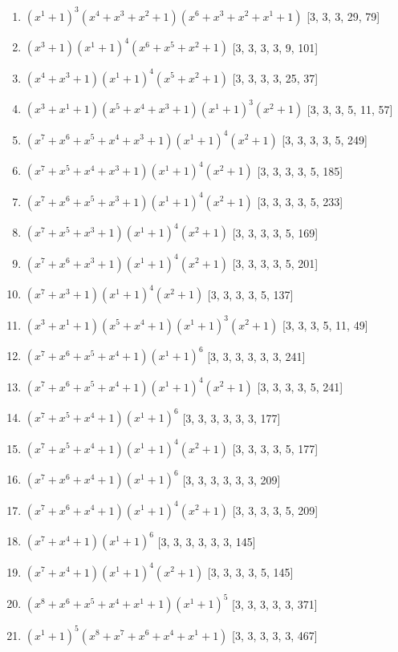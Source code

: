 \documentclass[10pt,twocolumn]{article}
\begin{document}
\begin{enumerate}
\item $(x^{1} + 1)^{3}(x^{4} + x^{3} + x^{2} + 1)(x^{6} + x^{3} + x^{2} + x^{1} + 1)$  [3, 3, 3, 29, 79]
\item $(x^{3} + 1)(x^{1} + 1)^{4}(x^{6} + x^{5} + x^{2} + 1)$  [3, 3, 3, 3, 9, 101]
\item $(x^{4} + x^{3} + 1)(x^{1} + 1)^{4}(x^{5} + x^{2} + 1)$  [3, 3, 3, 3, 25, 37]
\item $(x^{3} + x^{1} + 1)(x^{5} + x^{4} + x^{3} + 1)(x^{1} + 1)^{3}(x^{2} + 1)$  [3, 3, 3, 5, 11, 57]
\item $(x^{7} + x^{6} + x^{5} + x^{4} + x^{3} + 1)(x^{1} + 1)^{4}(x^{2} + 1)$  [3, 3, 3, 3, 5, 249]
\item $(x^{7} + x^{5} + x^{4} + x^{3} + 1)(x^{1} + 1)^{4}(x^{2} + 1)$  [3, 3, 3, 3, 5, 185]
\item $(x^{7} + x^{6} + x^{5} + x^{3} + 1)(x^{1} + 1)^{4}(x^{2} + 1)$  [3, 3, 3, 3, 5, 233]
\item $(x^{7} + x^{5} + x^{3} + 1)(x^{1} + 1)^{4}(x^{2} + 1)$  [3, 3, 3, 3, 5, 169]
\item $(x^{7} + x^{6} + x^{3} + 1)(x^{1} + 1)^{4}(x^{2} + 1)$  [3, 3, 3, 3, 5, 201]
\item $(x^{7} + x^{3} + 1)(x^{1} + 1)^{4}(x^{2} + 1)$  [3, 3, 3, 3, 5, 137]
\item $(x^{3} + x^{1} + 1)(x^{5} + x^{4} + 1)(x^{1} + 1)^{3}(x^{2} + 1)$  [3, 3, 3, 5, 11, 49]
\item $(x^{7} + x^{6} + x^{5} + x^{4} + 1)(x^{1} + 1)^{6}$  [3, 3, 3, 3, 3, 3, 241]
\item $(x^{7} + x^{6} + x^{5} + x^{4} + 1)(x^{1} + 1)^{4}(x^{2} + 1)$  [3, 3, 3, 3, 5, 241]
\item $(x^{7} + x^{5} + x^{4} + 1)(x^{1} + 1)^{6}$  [3, 3, 3, 3, 3, 3, 177]
\item $(x^{7} + x^{5} + x^{4} + 1)(x^{1} + 1)^{4}(x^{2} + 1)$  [3, 3, 3, 3, 5, 177]
\item $(x^{7} + x^{6} + x^{4} + 1)(x^{1} + 1)^{6}$  [3, 3, 3, 3, 3, 3, 209]
\item $(x^{7} + x^{6} + x^{4} + 1)(x^{1} + 1)^{4}(x^{2} + 1)$  [3, 3, 3, 3, 5, 209]
\item $(x^{7} + x^{4} + 1)(x^{1} + 1)^{6}$  [3, 3, 3, 3, 3, 3, 145]
\item $(x^{7} + x^{4} + 1)(x^{1} + 1)^{4}(x^{2} + 1)$  [3, 3, 3, 3, 5, 145]
\item $(x^{8} + x^{6} + x^{5} + x^{4} + x^{1} + 1)(x^{1} + 1)^{5}$  [3, 3, 3, 3, 3, 371]
\item $(x^{1} + 1)^{5}(x^{8} + x^{7} + x^{6} + x^{4} + x^{1} + 1)$  [3, 3, 3, 3, 3, 467]

\end{enumerate}
\end{document}
